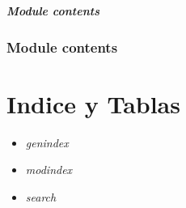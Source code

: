 \documentclass[letterpaper,10pt,spanish]{sphinxmanual}
\begin{document}

\begin{fulllineitems}
\label{webServices.wsGanados:webServices.wsGanados.views.wsWormer_view}
\end{fulllineitems}



\paragraph{Module contents}
\label{webServices.wsGanados:module-webServices.wsGanados}\label{webServices.wsGanados:module-contents}

\subsection{Module contents}
\label{webServices:module-webServices}\label{webServices:module-contents}

\chapter{Indice y Tablas}
\label{index:indices-and-tables}\begin{itemize}
\item {} 
\emph{genindex}

\item {} 
\emph{modindex}

\item {} 
\emph{search}

\end{itemize}
\end{document}
